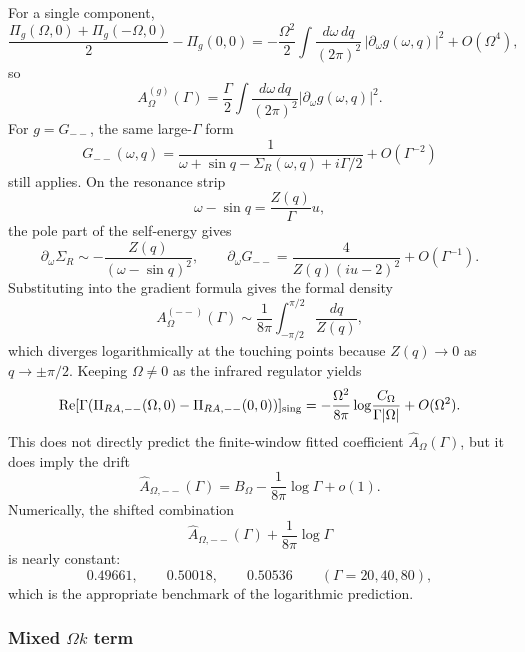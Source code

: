 \documentclass[aps,prx,preprint,amsmath,amssymb]{revtex4-2}
\renewcommand{\Re}{\text{Re}}
\begin{document}
For a single component,
\begin{equation}
\frac{\Pi_g(\Omega,0)+\Pi_g(-\Omega,0)}{2}-\Pi_g(0,0)
=
-\frac{\Omega^2}{2}\int\frac{d\omega\,dq}{(2\pi)^2}\,
|\partial_\omega g(\omega,q)|^2
+O(\Omega^4),
\end{equation}
so
\begin{equation}
A_\Omega^{(g)}(\Gamma)
=
\frac{\Gamma}{2}\int\frac{d\omega\,dq}{(2\pi)^2}
|\partial_\omega g(\omega,q)|^2.
\end{equation}
For \(g=G_{--}\), the same large-\(\Gamma\) form
\[
G_{--}(\omega,q)
=
\frac{1}{\omega+\sin q-\Sigma_R(\omega,q)+i\Gamma/2}
+O(\Gamma^{-2})
\]
still applies.  On the resonance strip
\[
\omega-\sin q=\frac{Z(q)}{\Gamma}u,
\]
the pole part of the self-energy gives
\[
\partial_\omega\Sigma_R \sim -\frac{Z(q)}{(\omega-\sin q)^2},
\qquad
\partial_\omega G_{--}
=
\frac{4}{Z(q)(iu-2)^2}+O(\Gamma^{-1}).
\]
Substituting into the gradient formula gives the formal density
\[
A_\Omega^{(--)}(\Gamma)\sim \frac{1}{8\pi}\int_{-\pi/2}^{\pi/2}\frac{dq}{Z(q)},
\]
which diverges logarithmically at the touching points because \(Z(q)\to 0\) as
\(q\to\pm\pi/2\).  Keeping \(\Omega\neq 0\) as the infrared regulator yields
\begin{equation}\label{eq:Aomega-final-app}
\Re[\Gamma(\Pi_{RA,--}(\Omega,0)-\Pi_{RA,--}(0,0))]_{\rm sing}
=
-\frac{\Omega^2}{8\pi}\log\!\frac{C_\Omega}{\Gamma|\Omega|}
+O(\Omega^2).
\end{equation}
This does not directly predict the finite-window fitted coefficient
\(\widehat A_\Omega(\Gamma)\), but it does imply the drift
\[
\widehat A_{\Omega,--}(\Gamma)
=
B_\Omega-\frac{1}{8\pi}\log\Gamma+o(1).
\]
Numerically, the shifted combination
\[
\widehat A_{\Omega,--}(\Gamma)+\frac{1}{8\pi}\log\Gamma
\]
is nearly constant:
\[
0.49661,\qquad 0.50018,\qquad 0.50536
\qquad
(\Gamma=20,40,80),
\]
which is the appropriate benchmark of the logarithmic prediction.

\subsubsection{Mixed \texorpdfstring{$\Omega k$}{Omega k} term}
\end{document}
